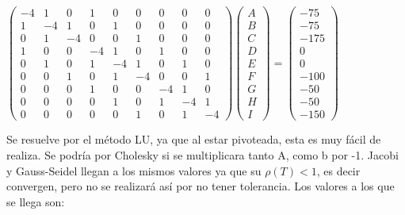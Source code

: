 \documentclass[10pt,twoside]{article}
\begin{document}
$ 
 \begin{pmatrix}
  -4  & 1 &  0 &  1 &  0 &  0 &  0 &  0 &  0  \\
   1  & -4 &  1 &  0 &  1 &  0 &  0 &  0 &  0  \\
   0 &  1 &  -4 &  0 &  0 &  1 &  0 &  0 &  0  \\
   1  & 0 &  0 &  -4 &  1 &  0 &  1 &  0 &  0  \\
   0  & 1 &  0 &  1 &  -4 &  1 &  0 &  1 &  0  \\
   0 &  0 &  1 &  0 &  1 &  -4 &  0 &  0 &  1  \\
   0  & 0 &  0 &  1 &  0 &  0  & -4 &  1 &  0  \\ 
   0 &  0  & 0 &  0 &  1 &  0 &  1 &  -4 &  1  \\
   0 &  0  & 0 &  0 &  0 &  1 &  0 &  1 &  -4  
 \end{pmatrix}
 \begin{pmatrix}
  A \\
   B \\
   C \\
   D \\
   E \\
   F \\
   G \\
   H \\
   I  
  \end{pmatrix}
   = \begin{pmatrix}
  -75 \\
   -75 \\
   -175 \\
   0 \\
   0 \\
   -100 \\
   -50 \\
   -50 \\
   -150 
  \end{pmatrix}
 $
 
\vspace{2.5mm}

Se resuelve por el método LU, ya que al estar pivoteada, esta es muy fácil de realiza. Se podría por Cholesky si se multiplicara tanto A, como b por -1. Jacobi y Gauss-Seidel llegan a los mismos valores ya que su $\rho (T)<1$, es decir convergen, pero no se realizará así por no tener tolerancia. Los valores a los que se llega son:
\end{document}
